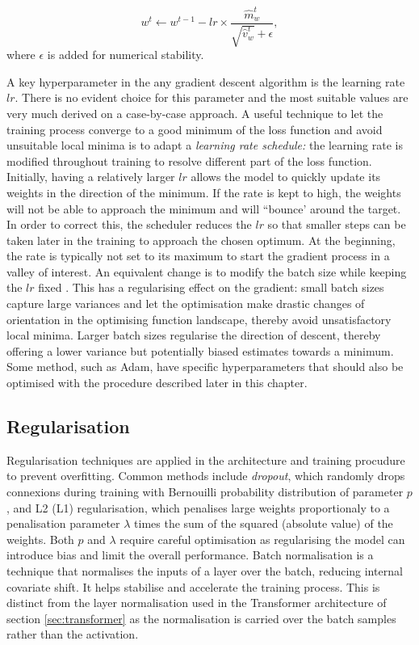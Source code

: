 \begin{itemize}
    \begin{equation}\label{eq:adam}
        w^{t} \leftarrow w^{t-1} - lr \times \frac{\hat{m}^t_w}{\sqrt{\hat{v}^t_w} + \epsilon},
    \end{equation}
    where $\epsilon$ is added for numerical stability.
\end{itemize}

A key hyperparameter in the any gradient descent algorithm is the learning rate $lr$. There is no evident choice for this parameter and the most suitable values are very much derived on a case-by-case approach. A useful technique to let the training process converge to a good minimum of the loss function and avoid unsuitable local minima is to adapt a \textit{learning rate schedule:} the learning rate is modified throughout training to resolve different part of the loss function. Initially, having a relatively larger $lr$ allows the model to quickly update its weights in the direction of the minimum. If the rate is kept to high, the weights will not be able to approach the minimum and will ``bounce' around the target. In order to correct this, the scheduler reduces the $lr$ so that smaller steps can be taken later in the training to approach the chosen optimum. At the beginning, the rate is typically not set to its maximum to start the gradient process in a valley of interest. An equivalent change is to modify the batch size while keeping the $lr$ fixed \cite{smith2017decay}. This has a regularising effect on the gradient: small batch sizes capture large variances and let the optimisation make drastic changes of orientation in the optimising function landscape, thereby avoid unsatisfactory local minima. Larger batch sizes regularise the direction of descent, thereby offering a lower variance but potentially biased estimates towards a minimum. Some method, such as Adam, have specific hyperparameters that should also be optimised with the procedure described later in this chapter.

\subsection{Regularisation}
Regularisation techniques are applied in the architecture and training procudure to prevent overfitting. Common methods include \textit{dropout}, which randomly drops connexions during training with Bernouilli probability distribution of parameter $p$, and L2 (L1) regularisation, which penalises large weights proportionaly to a penalisation parameter $\lambda$ times the sum of the squared (absolute value) of the weights. Both $p$ and $\lambda$ require careful optimisation as regularising the model can introduce bias and limit the overall performance. Batch normalisation is a technique that normalises the inputs of a layer over the batch, reducing internal covariate shift. It helps stabilise and accelerate the training process. This is distinct from the layer normalisation used in the Transformer architecture of section \ref{sec:transformer} as the normalisation is carried over the batch samples rather than the activation. 

